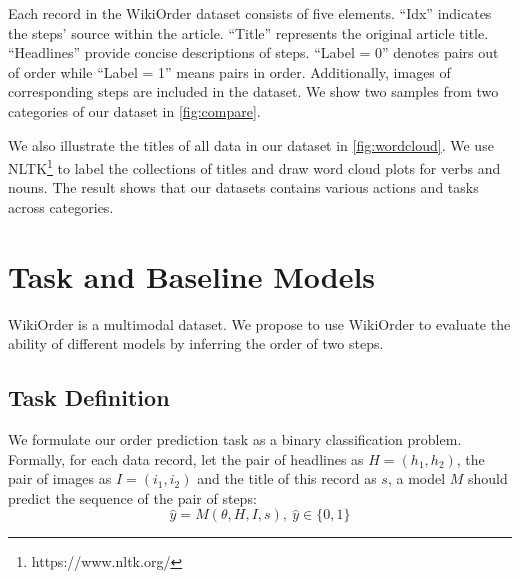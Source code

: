 \documentclass[11pt]{article}
\newcommand{\MY}[1]{\textcolor{orange}{(Mengyue: #1})}
\begin{document}
Each record in the WikiOrder dataset consists of five elements. “Idx” indicates the steps' source within the article. “Title” represents the original article title. “Headlines” provide concise descriptions of steps. “Label = 0” denotes pairs out of order while “Label = 1” means pairs in order. Additionally, images of corresponding steps are included in the dataset. We show two samples from two categories of our dataset in \autoref{fig:compare}.



We also illustrate the titles of all data in our dataset in \autoref{fig:wordcloud}. We use NLTK\footnote{https://www.nltk.org/} to label the collections of titles and draw word cloud plots for verbs and nouns. The result shows that our datasets contains various actions and tasks across categories.





\section{Task and Baseline Models}
WikiOrder is a multimodal dataset. We propose to use WikiOrder to evaluate the ability of different models by inferring the order of two steps. 
\subsection{Task Definition}
We formulate our order prediction task as a binary classification problem. Formally, for each data record, let the pair of headlines as $H=(h_1, h_2)$, the pair of images as $I=(i_1, i_2)$ and the title of this record as $s$, a model $M$ should predict the sequence of the pair of steps: 
\begin{equation}
    \hat{y} = M(\theta,H,I,s), ~\hat{y} \in \{0,1\}
\end{equation}
\end{document}
